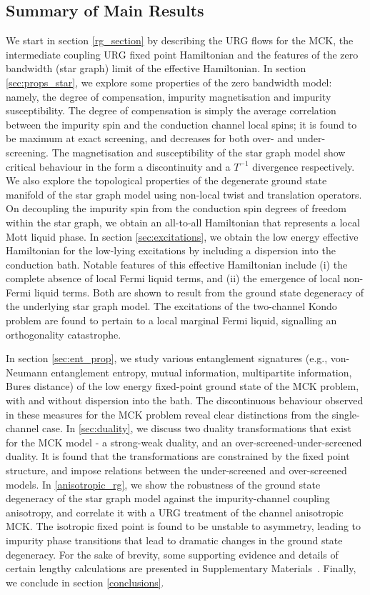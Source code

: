 \documentclass[reprint,prb,superscriptaddress]{revtex4-2}
\begin{document}
\subsection*{Summary of Main Results}
We start in section \ref{rg_section} by describing the URG flows for the MCK, the intermediate coupling URG fixed point Hamiltonian and the features of the zero bandwidth (star graph) limit of the effective Hamiltonian.
In section \ref{sec:props_star}, we explore some properties of the zero bandwidth model: namely, the degree of compensation, impurity magnetisation and impurity susceptibility.
The degree of compensation is simply the average correlation between the impurity spin and the conduction channel local spins; it is found to be maximum at exact screening, and decreases for both over- and under-screening.
The magnetisation and susceptibility of the star graph model show critical behaviour in the form a discontinuity and a \(T^{-1}\) divergence respectively.
We also explore the topological properties of the degenerate ground state manifold of the star graph model using non-local twist and translation operators.
On decoupling the impurity spin from the conduction spin degrees of freedom within the star graph, we obtain an all-to-all Hamiltonian that represents a local Mott liquid phase.
In section \ref{sec:excitations}, we obtain the low energy effective Hamiltonian for the low-lying excitations by including a dispersion into the conduction bath.
Notable features of this effective Hamiltonian include (i) the complete absence of local Fermi liquid terms, and (ii) the emergence of local non-Fermi liquid terms.
Both are shown to result from the ground state degeneracy of the underlying star graph model.
The excitations of the two-channel Kondo problem are found to pertain to a local marginal Fermi liquid, signalling an orthogonality catastrophe. 

In section \ref{sec:ent_prop}, we study various entanglement signatures (e.g., von-Neumann entanglement entropy, mutual information, multipartite information, Bures distance) of the low energy fixed-point ground state of the MCK problem, with and without dispersion into the bath. The discontinuous behaviour observed in these measures for the MCK problem reveal clear distinctions from the single-channel case. In \ref{sec:duality}, we discuss two duality transformations that exist for the MCK model - a strong-weak duality, and an over-screened-under-screened duality. It is found that the transformations are constrained by the fixed point structure, and impose relations between the under-screened and over-screened models.
In \ref{anisotropic_rg}, we show the robustness of the ground state degeneracy of the star graph model against the impurity-channel coupling anisotropy, and correlate it with a URG treatment of the channel anisotropic MCK.
The isotropic fixed point is found to be unstable to asymmetry, leading to impurity phase transitions that lead to dramatic changes in the ground state degeneracy.
For the sake of brevity, some supporting evidence and details of certain lengthy calculations are presented in Supplementary Materials~\cite{SM}. Finally, we conclude in section \ref{conclusions}.
\end{document}
